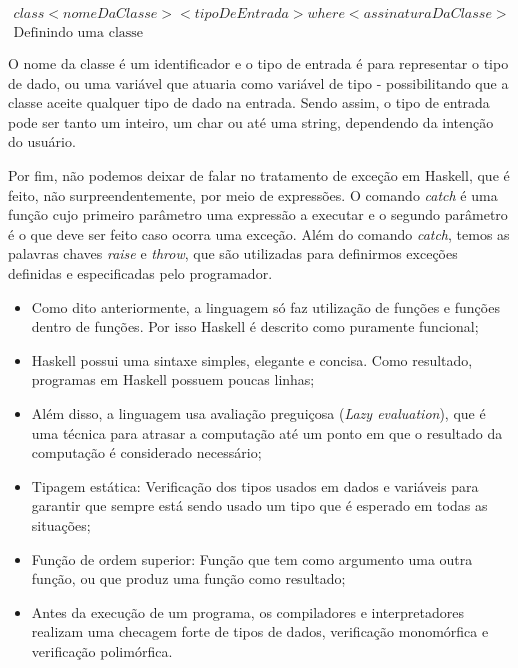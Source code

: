     \begin{gather*}
      class<nomeDaClasse><tipoDeEntrada>where<assinaturaDaClasse> \\
      \text{Definindo uma classe}
    \end{gather*}

    O nome da classe é um identificador e o tipo de entrada é para representar o tipo de dado, ou uma variável que atuaria como variável de tipo - possibilitando que a classe aceite qualquer tipo
    de dado na entrada. Sendo assim, o tipo de entrada pode ser tanto um inteiro, um char ou até uma string, dependendo da intenção do usuário.

    Por fim, não podemos deixar de falar no tratamento de exceção em Haskell, que é feito, não surpreendentemente, por meio de expressões. O comando \emph{catch} é uma função cujo primeiro parâmetro
    uma expressão a executar e o segundo parâmetro é o que deve ser feito caso ocorra uma exceção. Além do comando \emph{catch}, temos as palavras chaves \emph{raise} e \emph{throw}, que são utilizadas para definirmos
    exceções definidas e especificadas pelo programador.

    \begin{itemize}
      \item Como dito anteriormente, a linguagem só faz utilização de funções e funções dentro de funções. Por isso
      Haskell é descrito como puramente funcional;
      \item Haskell possui uma sintaxe simples, elegante e concisa. Como resultado, programas em Haskell possuem 
      poucas linhas;
      \item Além disso, a linguagem usa avaliação preguiçosa (\emph{Lazy evaluation}), que é uma técnica para atrasar a computação 
      até um ponto em que o resultado da computação é considerado necessário;
      \item Tipagem estática: Verificação dos tipos usados em dados e variáveis para 
      garantir que sempre está sendo usado um tipo que é esperado em todas as situações; 
      \item Função de ordem superior: Função que tem como argumento uma outra função, ou que produz 
      uma função como resultado;
      \item Antes da execução de um programa, os compiladores e interpretadores realizam uma checagem forte de tipos
      de dados, verificação monomórfica e verificação polimórfica.
    \end{itemize}